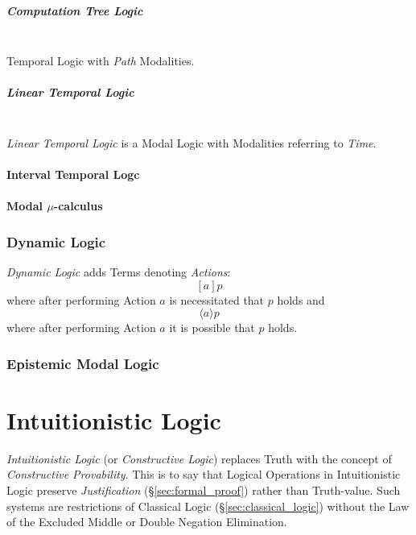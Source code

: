 \subparagraph{Computation Tree Logic}\label{sec:computation_tree_logic}
\hfill \\

Temporal Logic with \emph{Path} Modalities.


\subparagraph{Linear Temporal Logic}\label{sec:linear_temporal}
\hfill \\

\emph{Linear Temporal Logic} is a Modal Logic with Modalities
referring to \emph{Time}.



\paragraph{Interval Temporal Logc}\label{sec:interval_temporal}

\paragraph{Modal $\mu$-calculus}\label{sec:modal_mu}



\subsubsection{Dynamic Logic}\label{sec:dynamic_logic}

\emph{Dynamic Logic} adds Terms denoting \emph{Actions}:
\[[a]p\]
where after performing Action $a$ is necessitated that $p$ holds and
\[\langle a \rangle p\]
where after performing Action $a$ it is possible that $p$ holds.



\subsubsection{Epistemic Modal Logic}\label{sec:epistemic_logic}



\section{Intuitionistic Logic}\label{sec:intuitionistic_logic}

\emph{Intuitionistic Logic} (or \emph{Constructive Logic}) replaces
Truth with the concept of \emph{Constructive Provability}. This is to
say that Logical Operations in Intuitionistic Logic preserve
\emph{Justification} (\S\ref{sec:formal_proof}) rather than
Truth-value. Such systems are restrictions of Classical Logic
(\S\ref{sec:classical_logic}) without the Law of the Excluded Middle
or Double Negation Elimination.

